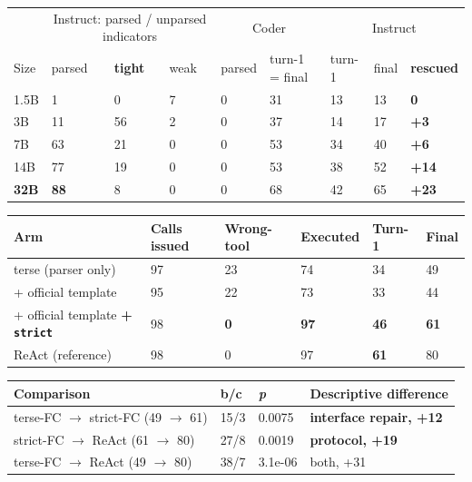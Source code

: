 \begin{center}
\begin{minipage}{\linewidth}
\centering
\small
{}\label{tab:instruct}\label{tab:turn1}
\setlength{\tabcolsep}{3.5pt}\begin{tabular}{@{}llll|ll|lll@{}}
\toprule
& \multicolumn{3}{c|}{Instruct: parsed / unparsed indicators} & \multicolumn{2}{c|}{Coder} & \multicolumn{3}{c}{Instruct} \\
Size & parsed & \textbf{tight} & weak & parsed & turn-1 = final & turn-1 & final & \textbf{rescued} \\
\midrule
1.5B & 1 & 0 & 7 & 0 & 31 & 13 & 13 & \textbf{0} \\
3B & 11 & 56 & 2 & 0 & 37 & 14 & 17 & \textbf{+3} \\
7B & 63 & 21 & 0 & 0 & 53 & 34 & 40 & \textbf{+6} \\
14B & 77 & 19 & 0 & 0 & 53 & 38 & 52 & \textbf{+14} \\
\textbf{32B} & \textbf{88} & 8 & 0 & 0 & 68 & 42 & 65 & \textbf{+23} \\
\bottomrule
\end{tabular}
\end{minipage}
\end{center}
\begin{center}
\begin{minipage}{\linewidth}
\centering
\small
{}\label{tab:llama_arms}
\begin{tabular}{@{}llllll@{}}
\toprule
Arm & Calls issued & Wrong-tool & Executed & Turn-1 & Final \\
\midrule
terse (parser only) & 97 & 23 & 74 & 34 & 49 \\
+ official template & 95 & 22 & 73 & 33 & 44 \\
+ official template \textbf{+ \texttt{strict}} & 98 & \textbf{0} & \textbf{97} & \textbf{46} & \textbf{61} \\
ReAct (reference) & 98 & 0 & 97 & \textbf{61} & 80 \\
\bottomrule
\end{tabular}
\end{minipage}
\end{center}
\begin{center}
\begin{minipage}{\linewidth}
\centering
\small
{}\label{tab:decomposition}
\begin{tabular}{@{}llll@{}}
\toprule
Comparison & b/c & \emph{p} & Descriptive difference \\
\midrule
terse-FC $\to$ strict-FC (49 $\to$ 61) & 15/3 & 0.0075 & \textbf{interface repair, +12} \\
strict-FC $\to$ ReAct (61 $\to$ 80) & 27/8 & 0.0019 & \textbf{protocol, +19} \\
terse-FC $\to$ ReAct (49 $\to$ 80) & 38/7 & 3.1e-06 & both, +31 \\
\bottomrule
\end{tabular}
\end{minipage}
\end{center}
